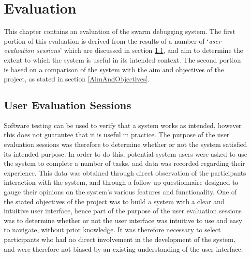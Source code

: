 
\chapter[Evaluation]{Evaluation} %

\label{ChapterEvaluation} %

This chapter contains an evaluation of the swarm debugging system. The first portion of this evaluation is derived from the results of a number of `\textit{user evaluation sessions}' which are discussed in section \ref{UserEvaluationSessions}, and aim to determine the extent to which the system is useful in its intended context. The second portion is based on a comparison of the system with the aim and objectives of the project, as stated in section \ref{AimAndObjectives}.


\section{User Evaluation Sessions} \label{UserEvaluationSessions}

Software testing can be used to verify that a system works as intended, however this does not guarantee that it is useful in practice. The purpose of the user evaluation sessions was therefore to determine whether or not the system satisfied its intended purpose. In order to do this, potential system users were asked to use the system to complete a number of tasks, and data was recorded regarding their experience. This data was obtained through direct observation of the participants interaction with the system, and through a follow up questionnaire designed to gauge their opinions on the system's various features and functionality. One of the stated objectives of the project was to build a system with a clear and intuitive user interface, hence part of the purpose of the user evaluation sessions was to determine whether or not the user interface was intuitive to use and easy to navigate, without prior knowledge. It was therefore necessary to select participants who had no direct involvement in the development of the system, and were therefore not biased by an existing understanding of the user interface.

